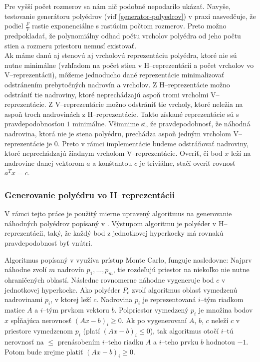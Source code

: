 Pre vyšší počet rozmerov sa nám nič podobné nepodarilo ukázať. Navyše, testovanie generátoru polyédrov (viď \ref{generator-polyedrov}) v praxi nasvedčuje, že podiel $\frac F V$ rastie exponenciálne s rastúcim počtom rozmerov. Preto možno predpokladať, že polynomiálny odhad počtu vrcholov polyédra od jeho počtu stien a rozmeru priestoru nemusí existovať.\\

Ak máme danú aj stenovú aj vrcholovú reprezentáciu polyédra, ktoré nie sú nutne minimálne (vzhľadom na počet stien v H--reprezentácii a počet vrcholov vo V--reprezentácii), môžeme jednoducho dané reprezentácie minimalizovať odstránením prebytočných nadrovín a vrcholov. Z H--reprezentácie možno odstrániť tie nadroviny, ktoré neprechádzajú aspoň tromi vrcholmi V--reprezentácie. Z V--reprezentácie možno odstrániť tie vrcholy, ktoré neležia na aspoň troch nadrovinách z H--reprezentácie. Takto získané reprezentácie sú s pravdepodobnosťou $1$ minimálne. Všimnime si, že pravdepodobnosť, že náhodná nadrovina, ktorá nie je stena polyédru, prechádza aspoň jedným vrcholom V--reprezentácie je $0$. Preto v rámci implementácie budeme odstráňovať nadroviny, ktoré neprechádzajú žiadnym vrcholom V--reprezentácie.
Overiť, či bod $x$ leží na nadrovine danej vektorom $a$ a konštantou $c$ je triviálne, stačí overiť rovnosť $a^Tx=c$.

\subsubsection{Generovanie polyédru vo H--reprezentácii}

V rámci tejto práce je použitý mierne upravený algoritmus na generovanie náhodných polyédrov popísaný v \cite{random_may}. Výstupom algoritmu je polyéder v H--reprezentácii, taký, že každý bod z jednotkovej hyperkocky má rovnakú pravdepodobnosť byť vnútri. 

Algoritmus popísaný v \cite{random_may} využíva prístup Monte Carlo, funguje nasledovne: Najprv náhodne zvolí $m$ nadrovín $p_1, \dots, p_m$, tie rozdeľujú priestor na niekoľko nie nutne ohraničených oblastí.
Následne rovnomerne náhodne vygeneruje bod $c$ v jednotkovej hyperkocke. Ako polyéder $P_c$ zvolí algoritmus oblasť vymedzenú nadrovinami $p_i$, v ktorej leží $c$. Nadrovina $p_i$ je reprezentovaná $i$--tým riadkom matice $A$ a $i$--tým prvkom vektoru $b$. Polpriestor vymedzený $p_i$ je množina bodov $x$ spĺňajúca nerovnosť $(Ax-b)_i \geq 0$. Ak po vygenerovaní $A$, $b$, $c$ neleží $c$ v priestore vymedzenom $p_i$ (platí $(Ax-b)_i \leq 0$), tak algoritmus otočí $i$--tú nerovnosť na $\leq$ prenásobením $i$--teho riadku $A$ a $i$--teho prvku $b$ hodnotou $-1$. Potom bude zrejme platiť $(Ax-b)_i \geq 0$.

